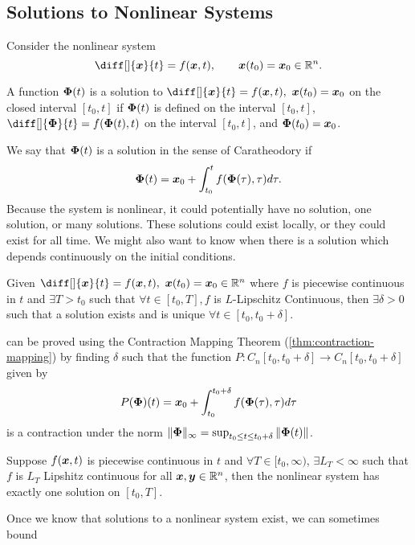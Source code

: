 \subsection{Solutions to Nonlinear Systems}
Consider the nonlinear system \[
	\diff[]{\bs{x}}{t} = f(\bs{x}, t),\qquad \bs{x}(t_0) = \bs{x}_0\in \R^n.
\]
\begin{definition}
	A function $\boldsymbol{\Phi}(t)$ is a solution to $\diff[]{\bs{x}}{t} = f(\bs{x}, t),\
	\bs{x}(t_0) = \bs{x}_0$ on the closed interval $[t_0, t]$ if $\boldsymbol{\Phi}(t)$
	is defined on the interval $[t_0, t]$, $\diff[]{\bs{\Phi}}{t} =
	f(\bs{\Phi}(t), t)$ on the interval $[t_0, t]$, and $\boldsymbol{\Phi}(t_0) =
	\boldsymbol{x}_0$.
	\label{defn:nonlinear-solution}
\end{definition}
We say that $\boldsymbol{\Phi}(t)$ is a solution in the sense of Caratheodory if \[
	\boldsymbol{\Phi}(t) = \boldsymbol{x}_0 + \int_{t_0}^t f(\boldsymbol{\Phi}(\tau), \tau)d\tau.
\]
Because the system is nonlinear, it could potentially have no solution, one
solution, or many solutions. These solutions could exist locally, or they could
exist for all time. We might also want to know when there is a solution which
depends continuously on the initial conditions.
\begin{theorem}
	Given $\diff[]{\bs{x}}{t} = f(\bs{x}, t),\ \bs{x}(t_0) = \bs{x}_0\in\R^n$ where
	$f$ is piecewise continuous in $t$ and $\exists T>t_0$ such that $\forall t\in
	[t_0, T], f$ is $L$-Lipschitz Continuous, then $\exists \delta > 0$ such that a
	solution exists and is unique $\forall t\in [t_0, t_0 + \delta]$.
	\label{thm:local-existence}
\end{theorem}
 can be proved using the Contraction Mapping Theorem
(\cref{thm:contraction-mapping}) by finding $\delta$ such that the function
$P:C_n[t_0, t_0+\delta] \to C_n[t_0, t_0+\delta]$ given by \[
	P(\boldsymbol{\Phi})(t) = \boldsymbol{x}_0 + \int_{t_0}^{t_0+\delta} f(\boldsymbol{\Phi}(\tau),
	\tau)d\tau
\]
is a contraction under the norm $\|\boldsymbol{\Phi}\|_\infty = \sup_{t_0\leq t \leq
t_0+\delta} \|\boldsymbol{\Phi}(t)\|$.
\begin{theorem}
	Suppose $f(\boldsymbol{x}, t)$ is piecewise continuous in $t$ and $\forall T\in [t_0,
	\infty)$, $\exists L_T < \infty$ such that $f$ is $L_T$ Lipshitz continuous
	for all $\boldsymbol{x}, \boldsymbol{y} \in \mathbb{R}^n$, then the nonlinear system  has exactly one
	solution on $[t_0, T]$.
	\label{thm:global-existence}
\end{theorem}
Once we know that solutions to a nonlinear system exist, we can sometimes bound
